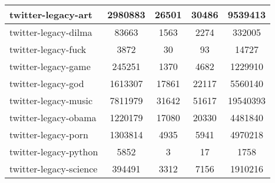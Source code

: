 \begin{center}
\begin{longtable}{| l | c | c | c | c |}
twitter-legacy-art & 2980883  & 26501  & 30486  & 9539413 \\\hline
twitter-legacy-dilma & 83663  & 1563  & 2274  & 332005 \\\hline
twitter-legacy-fuck & 3872  & 30  & 93  & 14727 \\\hline
twitter-legacy-game & 245251  & 1370  & 4682  & 1229910 \\\hline
twitter-legacy-god & 1613307  & 17861  & 22117  & 5560140 \\\hline
twitter-legacy-music & 7811979  & 31642  & 51617  & 19540393 \\\hline
twitter-legacy-obama & 1220179  & 17080  & 20330  & 4481840 \\\hline
twitter-legacy-porn & 1303814  & 4935  & 5941  & 4970218 \\\hline
twitter-legacy-python & 5852  & 3  & 17  & 1758 \\\hline
twitter-legacy-science & 394491  & 3312  & 7156  & 1910216 \\\hline
\end{longtable}
\end{center}